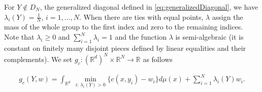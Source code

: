 \documentclass[11pt]{article}
\newcommand{\R}{\mathbb R}
\newcommand{\1}{\mathbbm{1}}
\numberwithin{equation}{section}
\begin{document}
For $Y \not \in D_N$, the generalized diagonal defined in \eqref{eq:generalizedDiagonal}, we have $\lambda_i(Y) = \frac{1}{N}$, $i = 1,\ldots, N$. When there are ties with equal points, $\lambda$ assign the mass of the whole group to the first index and zero to the remaining indices. Note that $\lambda_i \geq 0$ and $\sum_{i=1}^N \lambda_i = 1$ and the function $\lambda$ is semi-algebraic (it is constant on finitely many disjoint pieces defined by linear equalities and their complements). We set $g_c\colon (\R^d)^N \times \R^N\to\R$ as follows

\begin{align}
	g_c(Y,w) = \int_{\R^d} \ \min_{i:\, \lambda_i(Y)>0} \{c(x,y_i) - w_i\} d\mu(x) + \sum_{i=1}^N \lambda_i(Y) w_i.
	\label{eq:KantorovichDiagonalGc}
\end{align}
\end{document}
